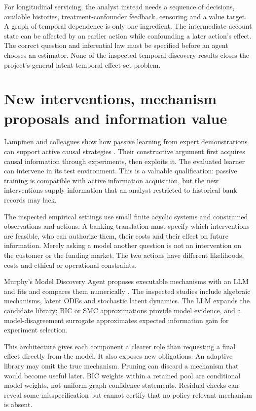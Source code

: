 For longitudinal servicing, the analyst instead needs a sequence of decisions,
available histories, treatment-confounder feedback, censoring and a value
target. A graph of temporal dependence is only one ingredient. The
intermediate account state can be affected by an earlier action while
confounding a later action's effect. The correct question and inferential law
must be specified before an agent chooses an estimator. None of the inspected
temporal discovery results closes the project's general latent temporal
effect-set problem.

\section{New interventions, mechanism proposals and information value}

Lampinen and colleagues show how passive learning from expert demonstrations
can support active causal strategies \cite{v12_la_2305_16183}. Their
constructive argument first acquires causal information through experiments,
then exploits it. The evaluated learner can intervene in its test environment.
This is a valuable qualification: passive training is compatible with active
information acquisition, but the new interventions supply information that an
analyst restricted to historical bank records may lack.

The inspected empirical settings use small finite acyclic systems and
constrained observations and actions. A banking translation must specify which
interventions are feasible, who can authorize them, their costs and their
effect on future information. Merely asking a model another question is not
an intervention on the customer or the funding market. The two actions have
different likelihoods, costs and ethical or operational constraints.

Murphy's Model Discovery Agent proposes executable mechanisms with an LLM and
fits and compares them numerically \cite{v12_la_2608_09696}. The inspected
studies include algebraic mechanisms, latent ODEs and stochastic latent
dynamics. The LLM expands the candidate library; BIC or SMC approximations
provide model evidence, and a model-disagreement surrogate approximates
expected information gain for experiment selection.

This architecture gives each component a clearer role than requesting a final
effect directly from the model. It also exposes new obligations. An adaptive
library may omit the true mechanism. Pruning can discard a mechanism that
would become useful later. BIC weights within a retained pool are conditional
model weights, not uniform graph-confidence statements. Residual checks can
reveal some misspecification but cannot certify that no policy-relevant
mechanism is absent.

